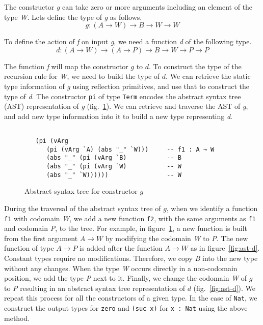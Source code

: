 \documentclass[sigplan,10pt]{acmart}
\begin{document}
The constructor \emph{g} can take zero or more arguments including an element of the type \emph{W}. Lets define the type of \emph{g} as follows.
\begin{equation}
g : (A \rightarrow W) \rightarrow B \rightarrow W \rightarrow W \nonumber
\end{equation}

To define the action of \emph{f} on input \emph{g}, we need a function \emph{d} of the following type.
\begin{equation}
d : (A \rightarrow W) \rightarrow (A \rightarrow P) \rightarrow B \rightarrow W \rightarrow P \rightarrow P \nonumber
\end{equation}

The function \emph{f} will map the constructor $g$ to $d$. To construct the type of the recursion rule for \emph{W}, we need to build the type of $d$. We can retrieve the static type information of \emph{g} using reflection primitives, and use that to construct the type of \emph{d}. The constructor {\tt pi} of type {\tt Term} encodes the abstract syntax tree (AST) representation of \emph{g} (fig.~\ref{fig:ast-g}). We can retrieve and traverse the AST of \emph{g}, and add new type information into it to build a new type representing \emph{d}.

\begin{figure}
\begin{center}
\begingroup
\fontsize{7pt}{9pt}\selectfont
\begin{Verbatim}[frame = single]

   (pi (vArg 
      (pi (vArg `A) (abs "_" `W)))     -- f1 : A → W
      (abs "_" (pi (vArg `B)           -- B
      (abs "_" (pi (vArg `W)           -- W
      (abs "_" `W))))))                -- W

\end{Verbatim}
\endgroup
\end{center}
\caption{Abstract syntax tree for constructor $g$}
\label{fig:ast-g}
\end{figure}

\normalsize

During the traversal of the abstract syntax tree of $g$, when we identify a function {\tt f1} with codomain \emph{W}, we add a new function {\tt f2}, with the same arguments as {\tt f1} and codomain \emph{P}, to the tree. For example, in figure~\ref{fig:ast-g}, a new function is built from the first argument $A \rightarrow W$ by modifying the codomain \emph{W} to \emph{P}. The new function of type $A \rightarrow P$ is added after the function $A \rightarrow W$ as in figure~\ref{fig:ast-d}. Constant types require no modifications. Therefore, we copy \emph{B} into the new type without any changes. When the type \emph{W} occurs directly in a non-codomain position, we add the type \emph{P} next to it. Finally, we change the codomain \emph{W} of $g$ to \emph{P} resulting in an abstract syntax tree representation of $d$ (fig.~\ref{fig:ast-d}). We repeat this process for all the constructors of a given type. In the case of {\tt Nat}, we construct the output types for {\tt zero} and {\tt (suc x)} for {\tt x : Nat} using the above method.
\end{document}
